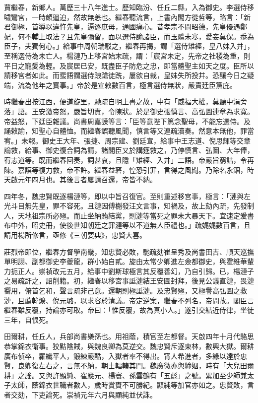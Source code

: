 \begin{pinyinscope}
賈繼春，新鄉人。萬歷三十八年進士。歷知臨汾、任丘二縣，入為御史。李選侍移噦鸞宮，一時頗逼迫，然故無恙也。繼春聽流言，上書內閣方從哲等，略言：「新君御極，首導以違忤先皇，逼逐庶母，通國痛心。昔孝宗不問昭德，先皇優遇鄭妃，何不輔上取法？且先皇彌留，面以選侍諭諸臣，而玉體未寒，愛妾莫保。忝為臣子，夫獨何心。」給事中周朝瑞駁之，繼春再揭，謂「選侍雉經，皇八妹入井」，至稱選侍為未亡人。楊漣乃上移宮始末疏，謂：「宸宮未定，先帝之社稷為重，則平日之寵愛為輕。及宸居已安，既盡臣子防危之忠，即當體聖主如天之度。臣所以請移宮者如此。而蜚語謂選侍踉蹌徒跣，屢欲自裁，皇妹失所投井。恐釀今日之疑端，流為他年之實事。」帝於是宣敕數百言，極言選侍無狀，嚴責廷臣黨庇。

時繼春出按江西，便道旋里，馳疏自明上書之故，中有「威福大權，莫聽中涓旁落」語。王安激帝怒，嚴旨切責，令陳狀。於是御史張慎言、高弘圖連章為求寬。帝益怒，下廷臣雜議。尚書周嘉謨等言：「臣等意陛下篤念聖母，不能忘選侍。及誦敕諭，知聖心自體恤。而繼春誤聽風聞，慎言等又連疏瀆奏。然意本無他，罪當宥。」未報。御史王大年、張捷、周宗建、劉廷宣，給事中王志道、倪思輝等交章論救，給事、御史復合詞為請，諸閣臣又於講筵救之，乃停慎言、弘圖、大年俸，宥志道等。既而繼春回奏，詞甚哀，且隱「雉經、入井」二語。帝嚴旨窮詰，令再陳。嘉謨等復力救，帝不許。繼春益窘，惶恐引罪，言得之風聞。乃除名永錮，時天啟元年四月也。其後言者屢請召還，帝皆不納。

四年冬，魏忠賢既逐楊漣等，即以中旨召復官。至則重述移宮事，極言：「漣與左光斗目無先皇，罪不容死。且漣因傅櫆發汪文言事，知禍及，故上劾內疏，先發制人，天地祖宗所必殛。而止坐納賄結黨，則漣等當死之罪未大暴天下。宜速定爰書布中外，昭史冊，使後世知朝廷之罪漣等以不道無人臣禮也。」疏娓娓數百言，且請用楊所修言，亟修《三朝要典》，忠賢大喜。

莊烈帝即位，繼春方督學南畿，知忠賢必敗，馳疏劾崔呈秀及尚書田吉、順天巡撫單明詡、副都御史李夔龍，群小始自貳。旋由太常少卿進左僉都御史，與霍維華輩力扼正人。崇禎改元五月，給事中劉斯球極言其反覆善幻，乃自引歸。已，楊漣子之易疏訐之，詔削籍。初，繼春以移宮事詆漣結王安圖封拜，後見公議直漣，畏漣嚮用，俯首乞和，聲言疏非己意。還朝則極詆漣。及忠賢殛，又極譽高弘圖之救漣，且薦韓爌、倪元璐，以求容於清議。帝定逆案，繼春不列名，帝問故。閣臣言繼春雖反覆，持論亦可取。帝曰：「惟反覆，故為真小人。」遂引交結近侍律，坐徒三年，自恨死。

田爾耕，任丘人，兵部尚書樂孫也。用祖蔭，積官至左都督。天啟四年十月代駱思恭掌錦衣衛事。狡黠陰賊，與魏良卿為莫逆交。魏忠賢斥逐東林，數興大獄。爾耕廣布偵卒，羅織平人，鍛練嚴酷，入獄者率不得出。宵人希進者，多緣以達於忠賢，良卿復左右之，言無不納，朝士輻輳其門。魏廣微亦與締姻，時有「大兒田爾耕」之謠。又與許顯純、崔應元、楊寰、孫雲鶴有「五彪」之號。累加至少師兼太子太師，蔭錦衣世職者數人，歲時賞賚不可勝紀。顯純等加官亦如之。忠賢敗，言者交劾，下吏論死。崇禎元年六月與顯純並伏誅。


\end{pinyinscope}
